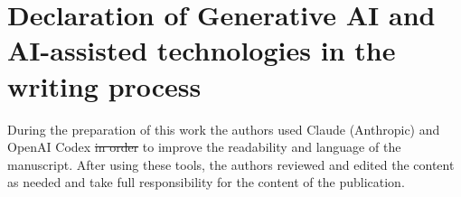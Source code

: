 \documentclass[preprint,12pt]{elsarticle}
\makeatletter
\providecommand{\DIFdeltex}[1]{{\protect\color{red}\sout{#1}}} %
\providecommand{\DIFdelbegin}{} %
\providecommand{\DIFdelend}{} %
\providecommand{\DIFdel}[1]{\texorpdfstring{\DIFdeltex{#1}}{}} %
\let\sout@orig\sout %
\renewcommand{\sout}[1]{\ifmmode\text{\sout@orig{\ensuremath{#1}}}\else\sout@orig{#1}\fi} %
\makeatother
\begin{document}
\section*{Declaration of Generative AI and AI-assisted technologies in the writing process}
During the preparation of this work the authors used Claude (Anthropic) and OpenAI Codex \DIFdelbegin \DIFdel{in order }\DIFdelend to improve the readability and language of the manuscript. After using these tools, the authors reviewed and edited the content as needed and take full responsibility for the content of the publication.

\setlength{\bibsep}{4pt}


\end{document}
